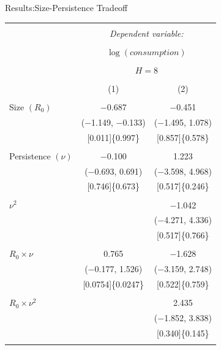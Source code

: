 \documentclass[11pt,pdf,aspectratio=129]{beamer}
\begin{document}
\begin{frame}{Results:}{Size-Persistence Tradeoff}\tiny\vspace{-2ex}
\begin{table}[!htb] \centering 
    \begin{threeparttable}
    \begin{tabular}{@{\extracolsep{10pt}}lcc} 
      \\[-1.8ex]\hline 
      \hline \\[-1.8ex] 
       & \multicolumn{2}{c}{\textit{Dependent variable:}} \\ 
      \cline{2-3} 
      \\[-1.8ex] & \multicolumn{2}{c}{$\log(\mathit{consumption})$} \\  \\[-1.8ex]   &\multicolumn{2}{c}{$H=8$}\\
      \\[-1.8ex] & (1) & (2)\\ 
      \hline \\[-1.8ex] 
       Size $(R_0)$  & $-$0.687 & $-$0.451 \\ 
        & ($-$1.149, $-$0.133) & ($-$1.495, 1.078)    \\ 
        &[0.011]\{0.997\} & [0.857]\{0.578\}\\ 
        & & \\ 
       Persistence $(\nu)$ & $-$0.100 & 1.223 \\ 
        & ($-$0.693,  0.691)   & ($-$3.598, 4.968)    \\ 
        &[0.746]\{0.673\} & [0.517]\{0.246\}\\ 
        & & \\ 
        $\nu^2$ &  & $-$1.042 \\ 
        &  &  ($-$4.271, 4.336) \\ 
        & &[0.517]\{0.766\} \\ 
        & & \\ 
       $R_0\times \nu$ & 0.765 & $-$1.628 \\ 
        & ($-$0.177,  1.526)    &   ($-$3.159,  2.748)     \\ 
        &[0.0754]\{0.0247\} & [0.522]\{0.759\}\\ 
        & & \\ 
        $R_0\times \nu^2$ &  & 2.435 \\ 
        &  &  ($-$1.852, 3.838) \\ 
        & & [0.340]\{0.145\}\\ 
        & & \\ 

\end{tabular}
\end{threeparttable}
\end{table}
\end{frame}
\end{document}

